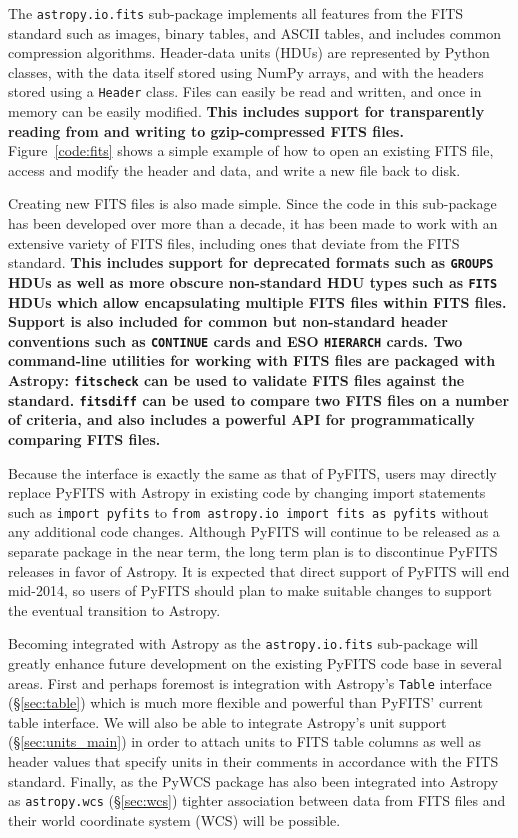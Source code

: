 \documentclass[traditabstract]{aa}
\begin{document}
The \texttt{astropy.io.fits} sub-package implements all features from the FITS
standard \citep{fits3} such as images, binary tables, and ASCII tables, and
includes common compression algorithms. Header-data units (HDUs) are
represented by Python classes, with the data itself stored using NumPy arrays,
and with the headers stored using a \texttt{Header} class. Files can easily be
read and written, and once in memory can be easily modified. \textbf{This
includes support for transparently reading from and writing to gzip-compressed
FITS files.}
Figure~\ref{code:fits} shows a simple example of how to open an existing FITS
file, access and modify the header and data, and write a new file back to disk.

Creating new FITS files is also made simple. Since the code in this sub-package
has been developed over more than a decade, it has been made to work with an
extensive variety of FITS files, including ones that deviate from the FITS
standard. \textbf{This includes support for deprecated formats such as
\texttt{GROUPS} HDUs as well as more obscure non-standard HDU types such as
\texttt{FITS} HDUs which allow encapsulating multiple FITS files within FITS
files. Support is also included for common but non-standard header conventions
such as \texttt{CONTINUE} cards and ESO \texttt{HIERARCH} cards.  Two
command-line utilities for working with FITS files are packaged with Astropy:
\texttt{fitscheck} can be used to validate FITS files against the standard.
\texttt{fitsdiff} can be used to compare two FITS files on a number of
criteria, and also includes a powerful API for programmatically comparing FITS
files.}

Because the interface is exactly the same as that of PyFITS, users may directly
replace PyFITS with Astropy in existing code by changing import statements such as
\texttt{import pyfits} to \texttt{from astropy.io import fits as pyfits}
without any additional code changes. Although PyFITS will continue to be
released as a separate package in the near term, the long term plan is to
discontinue PyFITS releases in favor of Astropy. It is expected that direct
support of PyFITS will end mid-2014, so users of PyFITS should plan to make
suitable changes to support the eventual transition to Astropy.

Becoming integrated with Astropy as the \texttt{astropy.io.fits} sub-package
will greatly enhance future development on the existing PyFITS code base in
several areas. First and perhaps foremost is integration with Astropy's
\texttt{Table} interface (\S\ref{sec:table}) which is much more flexible and
powerful than PyFITS' current table interface. We will also be able to
integrate Astropy's unit support (\S\ref{sec:units_main}) in order to attach
units to FITS table columns as well as header values that specify units in
their comments in accordance with the FITS standard. Finally, as the PyWCS
package has also been integrated into Astropy as \texttt{astropy.wcs}
(\S\ref{sec:wcs}) tighter association between data from FITS files and their
world coordinate system (WCS) will be possible.
\end{document}
